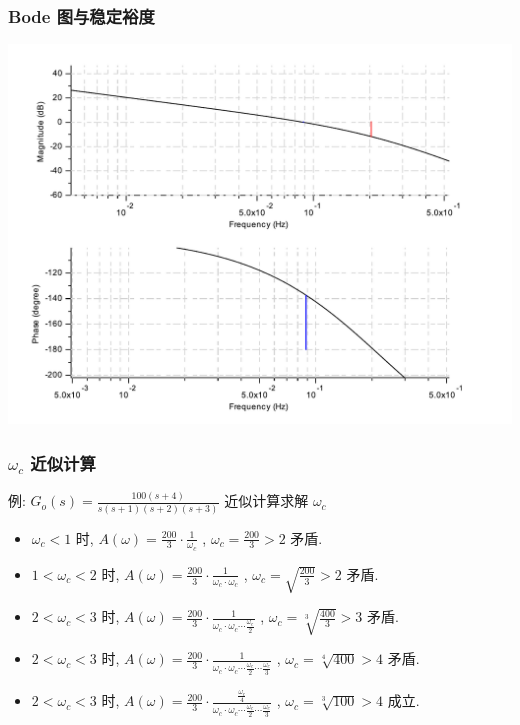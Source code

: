 \documentclass[table]{beamer}
\begin{document}
\begin{frame}
\frametitle{Bode 图与稳定裕度}
\label{sec-1-3}

\includegraphics[width=.9\linewidth]{image/margin_bode_scilab.pdf}
\end{frame}
\begin{frame}
\frametitle{$\omega_c$ 近似计算}
\label{sec-1-4}

 例: $G_o(s)=\frac{100(s+4)}{s(s+1)(s+2)(s+3)}$ 近似计算求解 $\omega_c$ 
\begin{itemize}
\item <3->$\omega_c<1$   时, $A(\omega)=\frac{200}{3}\cdot\frac{1}{\omega_c}$ , $\omega_c=\frac{200}{3}>2$ 矛盾.
\item <4->$1<\omega_c<2$ 时, $A(\omega)=\frac{200}{3}\cdot\frac{1}{\omega_c\cdot\omega_c}$ , $\omega_c=\sqrt{\frac{200}{3}}>2$ 矛盾.
\item <5->$2<\omega_c<3$ 时, $A(\omega)=\frac{200}{3}\cdot\frac{1}{\omega_c\cdot\omega_c\cdots\frac{\omega_c}{2}}$ , $\omega_c=\sqrt[3]{\frac{400}{3}}>3$ 矛盾.
\item <6->$2<\omega_c<3$ 时, $A(\omega)=\frac{200}{3}\cdot\frac{1}{\omega_c\cdot\omega_c\cdots\frac{\omega_c}{2}\cdots\frac{\omega_c}{3}}$ , $\omega_c=\sqrt[4]{400}>4$ 矛盾.
\item <7->$2<\omega_c<3$ 时, $A(\omega)=\frac{200}{3}\cdot\frac{\frac{\omega_c}{4}}{\omega_c\cdot\omega_c\cdots\frac{\omega_c}{2}\cdots\frac{\omega_c}{3}}$ , $\omega_c=\sqrt[3]{100}>4$ 成立.
\end{itemize}
\end{frame}
\end{document}
